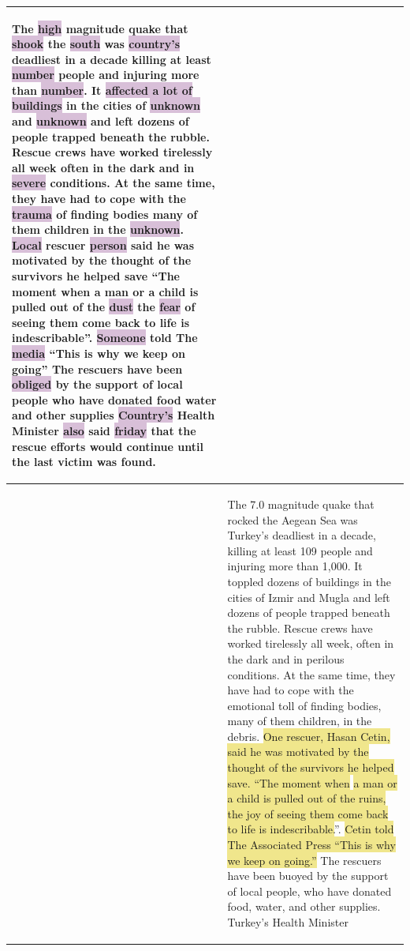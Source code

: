 \begin{table}[H]
{\begin{tabular}{p{}|p{}}
\begin{Large}
The \colorbox{Thistle}{high} magnitude quake that \colorbox{Thistle}{shook} the \colorbox{Thistle}{south} was \colorbox{Thistle}{country’s} deadliest in a decade killing at least \colorbox{Thistle}{number} people and injuring more than \colorbox{Thistle}{number}. It \colorbox{Thistle}{affected a lot of buildings} in the cities of \colorbox{Thistle}{unknown} and \colorbox{Thistle}{unknown} and left dozens of people trapped beneath the rubble. Rescue crews have worked tirelessly all week often in the dark and in \colorbox{Thistle}{severe} conditions. At the same time, they have had to cope with the \colorbox{Thistle}{trauma} of finding bodies many of them children in the \colorbox{Thistle}{unknown}. \colorbox{Thistle}{Local} rescuer \colorbox{Thistle}{person} said he was motivated by the thought of the survivors he helped save “The moment when a man or a child is pulled out of the \colorbox{Thistle}{dust} the \colorbox{Thistle}{fear} of seeing them come back to life is indescribable”. \colorbox{Thistle}{Someone} told The \colorbox{Thistle}{media} “This is why we keep on going” The rescuers have been \colorbox{Thistle}{obliged} by the support of local people who have donated food water and other supplies \colorbox{Thistle}{Country's} Health Minister \colorbox{Thistle}{also} said \colorbox{Thistle}{friday} that the rescue efforts would continue until the last victim was found.
\end{Large}
\\ \hline
\rotatebox[origin=r]{90}{\parbox[c]{2.5cm}{}}
& 
\begin{Large}
The 7.0 magnitude quake that rocked the Aegean Sea was Turkey's deadliest in a decade, killing at
least 109 people and injuring more than 1,000. It toppled dozens of buildings in the cities of Izmir
and Mugla and left dozens of people trapped beneath the rubble. Rescue crews have worked tirelessly
all week, often in the dark and in perilous conditions. At the same time, they have had to cope with
the emotional toll of finding bodies, many of them children, in the debris. \colorbox{Khaki}{One rescuer, Hasan Cetin, said he was motivated by the thought of the survivors he helped save. ``The moment when} \colorbox{Khaki}{a man or a child is pulled out of the ruins, the joy of seeing them come back to life is indescribable.}''. \colorbox{Khaki}{Cetin told The Associated Press “This is why we keep on going.”} The rescuers have been buoyed by the support of local people, who have donated food, water, and other supplies. Turkey’s Health Minister

\end{Large}
\end{tabular}}
\end{table}
